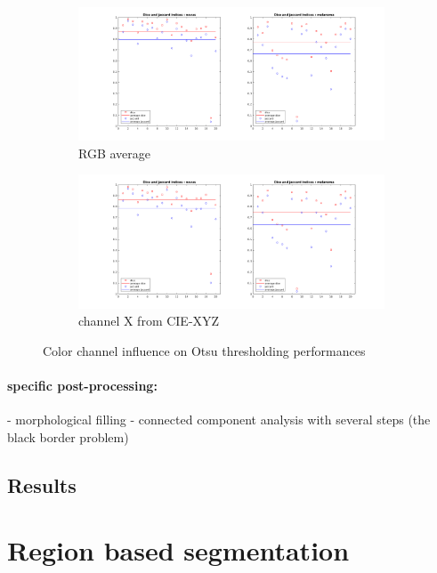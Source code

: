 \documentclass[a4paper,10pt]{article}
\begin{document}
\begin{figure}
\begin{subfigure}{0.7\textwidth}
		\includegraphics[width=0.9\linewidth]{../results/color-channel-influence/base-evaluation/otsu-dice-jaccard-meanRGB.png}
		\caption{RGB average}
		\label{fig:otsu-mean}
	\end{subfigure}
	\begin{subfigure}{0.7\textwidth}
		\includegraphics[width=0.9\linewidth]{../results/color-channel-influence/base-evaluation/otsu-dice-jaccard-X.png}
		\caption{channel X from CIE-XYZ}
		\label{fig:otsu-X}
	\end{subfigure}
	
	\caption{Color channel influence on Otsu thresholding performances}
	\label{fig:color-channel-otsu}
\end{figure} 


\paragraph{specific post-processing:}
- morphological filling
- connected component analysis with several steps (the black border problem)

\subsection{Results}

\section{Region based segmentation}
\end{document}

